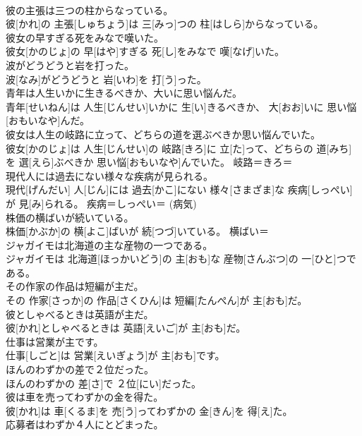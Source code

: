 \documentclass[8pt]{extreport}
\begin{document}
\begin{CJK}{UTF8}{min}
\\	彼の主張は三つの柱からなっている。	
\\	彼[かれ]の 主張[しゅちょう]は 三[みっ]つの 柱[はしら]からなっている。	
\\	彼女の早すぎる死をみなで嘆いた。	
\\	彼女[かのじょ]の 早[はや]すぎる 死[し]をみなで 嘆[なげ]いた。	
\\	波がどうどうと岩を打った。	
\\	波[なみ]がどうどうと 岩[いわ]を 打[う]った。	
\\	青年は人生いかに生きるべきか、大いに思い悩んだ。	
\\	青年[せいねん]は 人生[じんせい]いかに 生[い]きるべきか、 大[おお]いに 思い悩[おもいなや]んだ。	
\\	彼女は人生の岐路に立って、どちらの道を選ぶべきか思い悩んでいた。	
\\	彼女[かのじょ]は 人生[じんせい]の 岐路[きろ]に 立[た]って、どちらの 道[みち]を 選[えら]ぶべきか 思い悩[おもいなや]んでいた。	岐路＝きろ＝ 
\\	現代人には過去にない様々な疾病が見られる。	
\\	現代[げんだい] 人[じん]には 過去[かこ]にない 様々[さまざま]な 疾病[しっぺい]が 見[み]られる。	疾病＝しっぺい＝ (病気) 
\\	株価の横ばいが続いている。	
\\	株価[かぶか]の 横[よこ]ばいが 続[つづ]いている。	横ばい＝ 
\\	ジャガイモは北海道の主な産物の一つである。	
\\	ジャガイモは 北海道[ほっかいどう]の 主[おも]な 産物[さんぶつ]の 一[ひと]つである。	
\\	その作家の作品は短編が主だ。	
\\	その 作家[さっか]の 作品[さくひん]は 短編[たんぺん]が 主[おも]だ。	
\\	彼としゃべるときは英語が主だ。	
\\	彼[かれ]としゃべるときは 英語[えいご]が 主[おも]だ。	
\\	仕事は営業が主です。	
\\	仕事[しごと]は 営業[えいぎょう]が 主[おも]です。	
\\	ほんのわずかの差で２位だった。	
\\	ほんのわずかの 差[さ]で ２位[にい]だった。	
\\	彼は車を売ってわずかの金を得た。	
\\	彼[かれ]は 車[くるま]を 売[う]ってわずかの 金[きん]を 得[え]た。	
\\	応募者はわずか４人にとどまった。	

\end{CJK}
\end{document}
